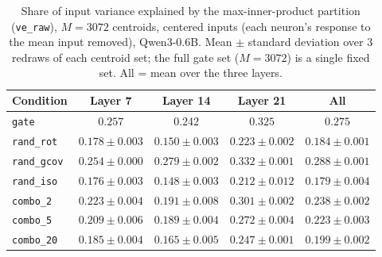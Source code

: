 \begin{table}[t]
\centering
\begin{tabular}{lcccc}
\toprule
Condition & Layer 7 & Layer 14 & Layer 21 & All \\
\midrule
\texttt{gate} & $0.257$ & $0.242$ & $0.325$ & $0.275$ \\
\addlinespace
\texttt{rand\_rot} & $0.178 \pm 0.003$ & $0.150 \pm 0.003$ & $0.223 \pm 0.002$ & $0.184 \pm 0.001$ \\
\texttt{rand\_gcov} & $0.254 \pm 0.000$ & $0.279 \pm 0.002$ & $0.332 \pm 0.001$ & $0.288 \pm 0.001$ \\
\texttt{rand\_iso} & $0.176 \pm 0.003$ & $0.148 \pm 0.003$ & $0.212 \pm 0.012$ & $0.179 \pm 0.004$ \\
\addlinespace
\texttt{combo\_2} & $0.223 \pm 0.004$ & $0.191 \pm 0.008$ & $0.301 \pm 0.002$ & $0.238 \pm 0.002$ \\
\texttt{combo\_5} & $0.209 \pm 0.006$ & $0.189 \pm 0.004$ & $0.272 \pm 0.004$ & $0.223 \pm 0.003$ \\
\texttt{combo\_20} & $0.185 \pm 0.004$ & $0.165 \pm 0.005$ & $0.247 \pm 0.001$ & $0.199 \pm 0.002$ \\
\bottomrule
\end{tabular}
\caption{Share of input variance explained by the max-inner-product partition (\texttt{ve\_raw}), $M = 3072$ centroids, centered inputs (each neuron's response to the mean input removed), Qwen3-0.6B. Mean $\pm$ standard deviation over 3 redraws of each centroid set; the full gate set ($M = 3072$) is a single fixed set. All = mean over the three layers.}
\label{tab:ve-raw-ip-centered-M3072}
\end{table}
